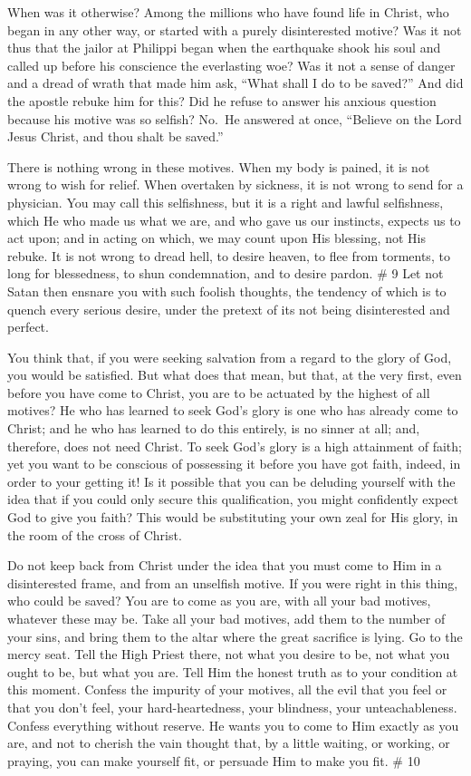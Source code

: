 \documentclass[
]{book}
\begin{document}
When was it otherwise? Among the millions who have found life in Christ, who began in any other way, or started with a purely disinterested motive? Was it not thus that the jailor at Philippi began when the earthquake shook his soul and called up before his conscience the everlasting woe? Was it not a sense of danger and a dread of wrath that made him ask, ``What shall I do to be saved?'' And did the apostle rebuke him for this? Did he refuse to answer his anxious question because his motive was so selfish? No.~He answered at once, ``Believe on the Lord Jesus Christ, and thou shalt be saved.''

There is nothing wrong in these motives. When my body is pained, it is not wrong to wish for relief. When overtaken by sickness, it is not wrong to send for a physician. You may call this selfishness, but it is a right and lawful selfishness, which He who made us what we are, and who gave us our instincts, expects us to act upon; and in acting on which, we may count upon His blessing, not His rebuke. It is not wrong to dread hell, to desire heaven, to flee from torments, to long for blessedness, to shun condemnation, and to desire pardon.
\# 9
Let not Satan then ensnare you with such foolish thoughts, the tendency of which is to quench every serious desire, under the pretext of its not being disinterested and perfect.

You think that, if you were seeking salvation from a regard to the glory of God, you would be satisfied. But what does that mean, but that, at the very first, even before you have come to Christ, you are to be actuated by the highest of all motives? He who has learned to seek God's glory is one who has already come to Christ; and he who has learned to do this entirely, is no sinner at all; and, therefore, does not need Christ. To seek God's glory is a high attainment of faith; yet you want to be conscious of possessing it before you have got faith, indeed, in order to your getting it! Is it possible that you can be deluding yourself with the idea that if you could only secure this qualification, you might confidently expect God to give you faith? This would be substituting your own zeal for His glory, in the room of the cross of Christ.

Do not keep back from Christ under the idea that you must come to Him in a disinterested frame, and from an unselfish motive. If you were right in this thing, who could be saved? You are to come as you are, with all your bad motives, whatever these may be. Take all your bad motives, add them to the number of your sins, and bring them to the altar where the great sacrifice is lying. Go to the mercy seat. Tell the High Priest there, not what you desire to be, not what you ought to be, but what you are. Tell Him the honest truth as to your condition at this moment. Confess the impurity of your motives, all the evil that you feel or that you don't feel, your hard-heartedness, your blindness, your unteachableness. Confess everything without reserve. He wants you to come to Him exactly as you are, and not to cherish the vain thought that, by a little waiting, or working, or praying, you can make yourself fit, or persuade Him to make you fit.
\# 10
\end{document}
